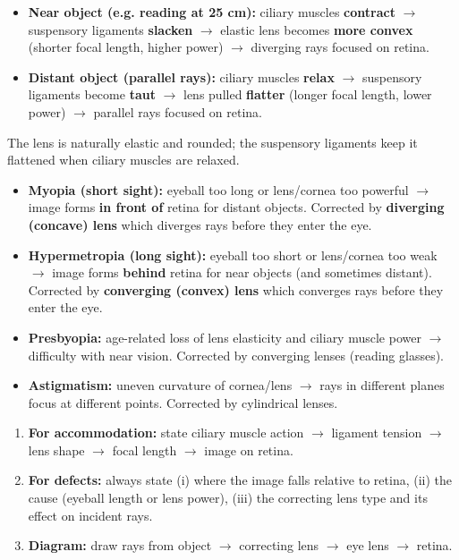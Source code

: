 \documentclass[11pt]{article}
\begin{document}
\begin{propriete}
\begin{itemize}
\item \textbf{Near object (e.g. reading at 25 cm):} ciliary muscles \textbf{contract} $\rightarrow$ suspensory ligaments \textbf{slacken} $\rightarrow$ elastic lens becomes \textbf{more convex} (shorter focal length, higher power) $\rightarrow$ diverging rays focused on retina.
\item \textbf{Distant object (parallel rays):} ciliary muscles \textbf{relax} $\rightarrow$ suspensory ligaments become \textbf{taut} $\rightarrow$ lens pulled \textbf{flatter} (longer focal length, lower power) $\rightarrow$ parallel rays focused on retina.
\end{itemize}
The lens is naturally elastic and rounded; the suspensory ligaments keep it flattened when ciliary muscles are relaxed.
\end{propriete}

\begin{definition}
\begin{itemize}
\item \textbf{Myopia (short sight):} eyeball too long or lens/cornea too powerful $\rightarrow$ image forms \textbf{in front of} retina for distant objects. Corrected by \textbf{diverging (concave) lens} which diverges rays before they enter the eye.
\item \textbf{Hypermetropia (long sight):} eyeball too short or lens/cornea too weak $\rightarrow$ image forms \textbf{behind} retina for near objects (and sometimes distant). Corrected by \textbf{converging (convex) lens} which converges rays before they enter the eye.
\item \textbf{Presbyopia:} age-related loss of lens elasticity and ciliary muscle power $\rightarrow$ difficulty with near vision. Corrected by converging lenses (reading glasses).
\item \textbf{Astigmatism:} uneven curvature of cornea/lens $\rightarrow$ rays in different planes focus at different points. Corrected by cylindrical lenses.
\end{itemize}
\end{definition}

\begin{methode}
\begin{enumerate}
\item \textbf{For accommodation:} state ciliary muscle action $\rightarrow$ ligament tension $\rightarrow$ lens shape $\rightarrow$ focal length $\rightarrow$ image on retina.
\item \textbf{For defects:} always state (i) where the image falls relative to retina, (ii) the cause (eyeball length or lens power), (iii) the correcting lens type and its effect on incident rays.
\item \textbf{Diagram:} draw rays from object $\rightarrow$ correcting lens $\rightarrow$ eye lens $\rightarrow$ retina.
\end{enumerate}
\end{methode}
\end{document}
